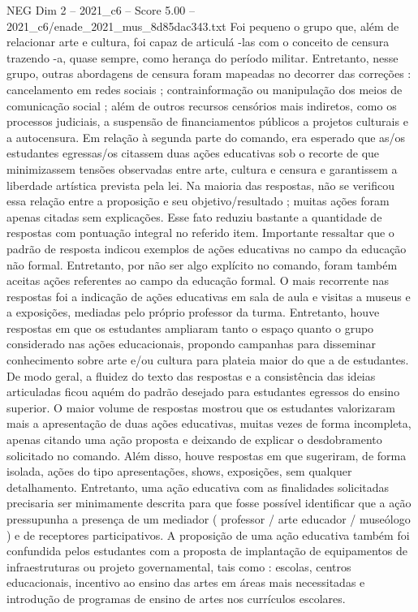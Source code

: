 \begin{textsample}{NEG Dim 2 – 2021\_c6 – Score 5.00 – 2021\_c6/enade\_2021\_mus\_8d85dac343.txt}
Foi pequeno o grupo que, além de relacionar arte e cultura, foi capaz de articulá -las com o conceito de censura trazendo -a, quase sempre, como herança do período militar.
Entretanto, nesse grupo, outras abordagens de censura foram mapeadas no decorrer das correções : cancelamento em redes sociais ; contrainformação ou manipulação dos meios de comunicação social ; além de outros recursos censórios mais indiretos, como os processos judiciais, a suspensão de financiamentos públicos a projetos culturais e a autocensura.
Em relação à segunda parte do comando, era esperado que as/os estudantes egressas/os citassem duas ações educativas sob o recorte de que minimizassem tensões observadas entre arte, cultura e censura e garantissem a liberdade artística prevista pela lei.
Na maioria das respostas, não se verificou essa relação entre a proposição e seu objetivo/resultado ; muitas ações foram apenas citadas sem explicações.
Esse fato reduziu bastante a quantidade de respostas com pontuação integral no referido item.
Importante ressaltar que o padrão de resposta indicou exemplos de ações educativas no campo da educação não formal.
Entretanto, por não ser algo explícito no comando, foram também aceitas ações referentes ao campo da educação formal.
O mais recorrente nas respostas foi a indicação de ações educativas em sala de aula e visitas a museus e a exposições, mediadas pelo próprio professor da turma.
Entretanto, houve respostas em que os estudantes ampliaram tanto o espaço quanto o grupo considerado nas ações educacionais, propondo campanhas para disseminar conhecimento sobre arte e/ou cultura para plateia maior do que a de estudantes.
De modo geral, a fluidez do texto das respostas e a consistência das ideias articuladas ficou aquém do padrão desejado para estudantes egressos do ensino superior.
O maior volume de respostas mostrou que os estudantes valorizaram mais a apresentação de duas ações educativas, muitas vezes de forma incompleta, apenas citando uma ação proposta e deixando de explicar o desdobramento solicitado no comando.
Além disso, houve respostas em que sugeriram, de forma isolada, ações do tipo apresentações, shows, exposições, sem qualquer detalhamento.
Entretanto, uma ação educativa com as finalidades solicitadas precisaria ser minimamente descrita para que fosse possível identificar que a ação pressupunha a presença de um mediador ( professor / arte educador / museólogo ) e de receptores participativos.
A proposição de uma ação educativa também foi confundida pelos estudantes com a proposta de implantação de equipamentos de infraestruturas ou projeto governamental, tais como : escolas, centros educacionais, incentivo ao ensino das artes em áreas mais necessitadas e introdução de programas de ensino de artes nos currículos escolares.

\end{textsample}
